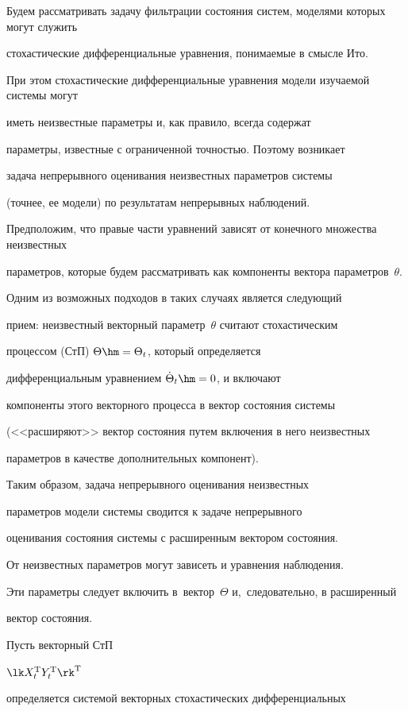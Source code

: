 Будем рассматривать задачу фильтрации состояния систем, моделями которых могут служить

стохастические дифференциальные  уравнения, понимаемые в смысле Ито. 

При этом стохастические дифференциальные уравнения модели изучаемой системы могут

иметь неизвестные параметры и, как правило, всегда содержат

параметры, известные с ограниченной точностью. Поэтому возникает

задача непрерывного оценивания неизвестных параметров системы

(точнее, ее модели) по результатам непрерывных наблюдений.

Предположим, что правые части уравнений зависят от конечного множества неизвестных 

параметров, которые будем рассматривать как компоненты вектора параметров~$\theta$.

Одним из возможных подходов в таких случаях является следующий

прием: неизвестный векторный параметр~$\theta$ считают стохастическим

процессом (СтП) $\Theta \hm=\Theta_t$, который определяется

дифференциальным уравнением $\dot\Theta_t \hm=0$, и включают

компоненты этого векторного процесса в вектор состояния системы

(<<расширяют>> вектор состояния путем включения в него неизвестных

параметров в качестве дополнительных компонент).

Таким образом, задача непрерывного оценивания неизвестных

параметров модели системы сводится к задаче непрерывного

оценивания состояния системы с расширенным вектором состояния.

От неизвестных параметров могут зависеть и уравнения наблюдения. 

Эти параметры следует включить в~вектор~$\Theta$ и,~следовательно, в расширенный 

вектор состояния.



Пусть векторный СтП 

$\lk X_t^{\mathrm{T}} Y_t^{\mathrm{T}} \rk^{\mathrm{T}}$

определяется системой векторных стохастических дифференциальных

